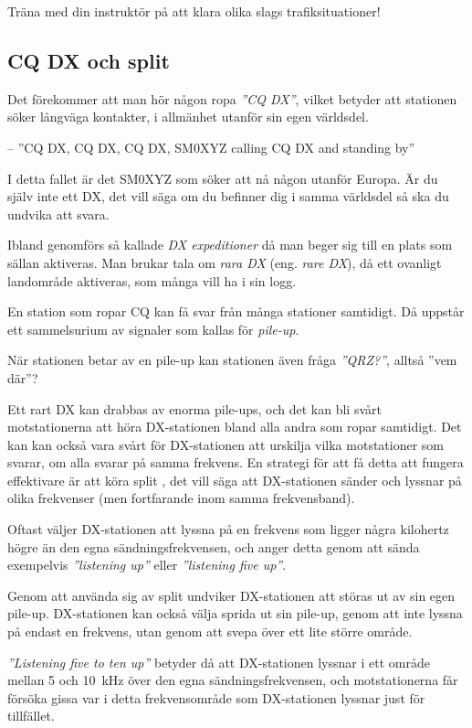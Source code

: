 Träna med din instruktör på att klara olika slags trafiksituationer!

\subsection{CQ DX och split}

Det förekommer att man hör någon ropa \emph{''CQ DX''}, vilket betyder att stationen söker långväga kontakter, i allmänhet utanför sin egen världsdel.

-- ''CQ DX, CQ DX, CQ DX, SM0XYZ calling CQ DX and standing by''

I detta fallet är det SM0XYZ som söker att nå någon utanför Europa.
Är du själv inte ett DX, det vill säga om du befinner dig i samma världsdel så ska du undvika att svara.

Ibland genomförs så kallade \emph{DX expeditioner} då man beger sig till en plats som sällan aktiveras. Man brukar tala om \emph{rara DX} (eng. \emph{rare DX}), då ett ovanligt landområde aktiveras, som många vill ha i sin logg.

En station som ropar CQ kan få svar från många stationer samtidigt. Då uppstår ett sammelsurium av signaler som kallas för \emph{pile-up}.

När stationen betar av en pile-up kan stationen även fråga \emph{''QRZ?''}, alltså ''vem där''?

Ett rart DX kan drabbas av enorma pile-ups, och det kan bli svårt motstationerna att höra DX-stationen bland alla andra som ropar samtidigt. Det kan kan också vara svårt för DX-stationen att urskilja vilka motstationer som svarar, om alla svarar på samma frekvens. En strategi för att få detta att fungera effektivare är att köra split \cite{LowBandDX}, det vill säga att DX-stationen sänder och lyssnar på olika frekvenser (men fortfarande inom samma frekvensband).

Oftast väljer DX-stationen att lyssna på en frekvens som ligger några kilohertz högre än den egna sändningsfrekvensen, och anger detta genom att sända exempelvis \emph{''listening up''} eller \emph{''listening five up''}.

Genom att använda sig av split undviker DX-stationen att störas ut av sin egen pile-up. DX-stationen kan också välja sprida ut sin pile-up, genom att inte lyssna på endast en frekvens, utan genom att svepa över ett lite större område.

\emph{''Listening five to ten up''} betyder då att DX-stationen lyssnar i ett område mellan 5 och 10~kHz över den egna sändningsfrekvensen, och motstationerna får försöka gissa var i detta frekvensområde som DX-stationen lyssnar just för tillfället.


